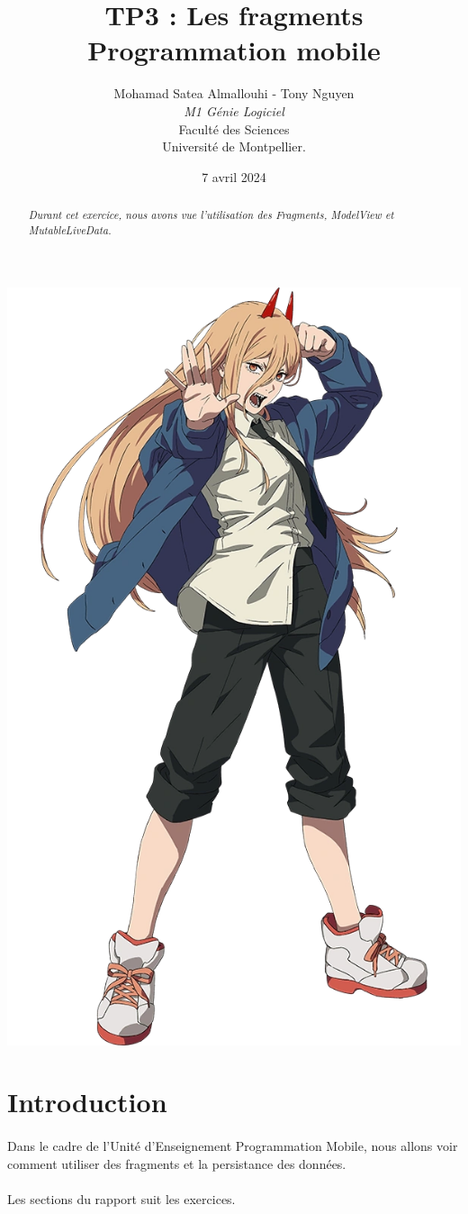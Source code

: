 \documentclass[a4paper]{article}
\title{  TP3 : Les fragments\\Programmation mobile}
\author{Mohamad Satea Almallouhi - Tony Nguyen\\\emph{M1 Génie Logiciel}\\Faculté des Sciences\\Université de Montpellier.}
\date{7 avril 2024}
\begin{document}
    \maketitle
    \begin{center}
        \includegraphics[height=.95\textwidth]{power}
    \end{center}

    \begin{abstract}     %
      \emph{Durant cet exercice, nous avons vue l'utilisation des Fragments, ModelView et MutableLiveData.}
    \end{abstract}
    \newpage
    \tableofcontents
    \section*{Introduction}
            \paragraph{}
                Dans le cadre de l'Unité d'Enseignement Programmation Mobile, nous allons voir comment utiliser des fragments et la persistance des données.
            \paragraph{}
                Les sections du rapport suit les exercices.
\end{document}
